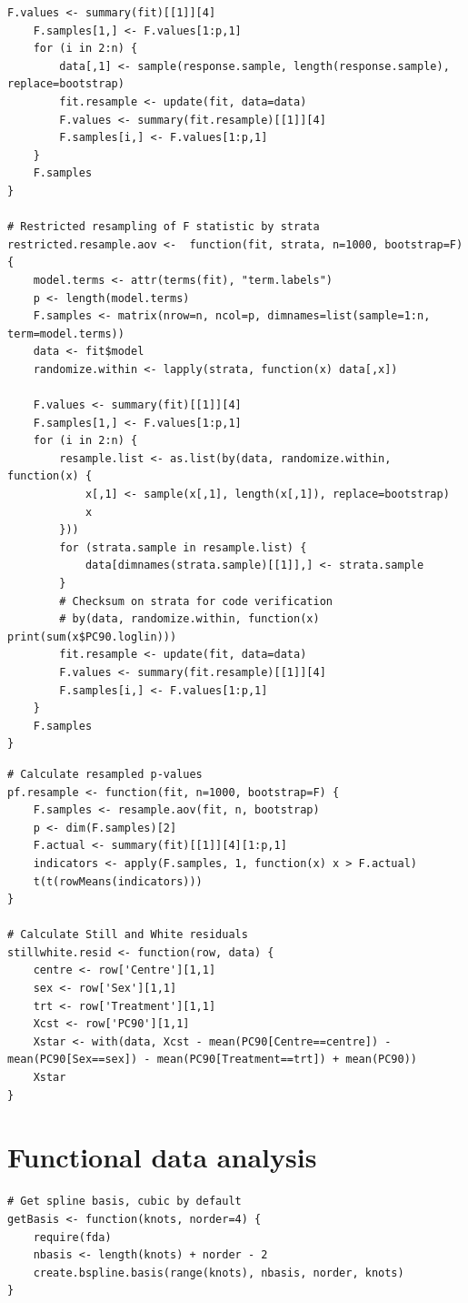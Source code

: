 \begin{singlespace}
\begin{lstlisting}[caption=Functions for resampling $F$ statistic,label=R:Fresamp]
	F.values <- summary(fit)[[1]][4]
	F.samples[1,] <- F.values[1:p,1]
	for (i in 2:n) {
		data[,1] <- sample(response.sample, length(response.sample), replace=bootstrap)
		fit.resample <- update(fit, data=data)
		F.values <- summary(fit.resample)[[1]][4]
		F.samples[i,] <- F.values[1:p,1]
	}
	F.samples	
}

# Restricted resampling of F statistic by strata
restricted.resample.aov <-  function(fit, strata, n=1000, bootstrap=F) {
	model.terms <- attr(terms(fit), "term.labels")
	p <- length(model.terms)
	F.samples <- matrix(nrow=n, ncol=p, dimnames=list(sample=1:n, term=model.terms))
	data <- fit$model
	randomize.within <- lapply(strata, function(x) data[,x])

	F.values <- summary(fit)[[1]][4]
	F.samples[1,] <- F.values[1:p,1]
	for (i in 2:n) {
		resample.list <- as.list(by(data, randomize.within, function(x) {
			x[,1] <- sample(x[,1], length(x[,1]), replace=bootstrap)
			x
		}))
		for (strata.sample in resample.list) {
			data[dimnames(strata.sample)[[1]],] <- strata.sample
		}
		# Checksum on strata for code verification
		# by(data, randomize.within, function(x) print(sum(x$PC90.loglin)))
		fit.resample <- update(fit, data=data)
		F.values <- summary(fit.resample)[[1]][4]
		F.samples[i,] <- F.values[1:p,1]
	}
	F.samples	
}
\end{lstlisting}

\begin{lstlisting}[caption=Functions to calculate resampled $p$-values and resampling residuals,label=R:resampmisc]
# Calculate resampled p-values
pf.resample <- function(fit, n=1000, bootstrap=F) {
	F.samples <- resample.aov(fit, n, bootstrap)
	p <- dim(F.samples)[2]
	F.actual <- summary(fit)[[1]][4][1:p,1]
	indicators <- apply(F.samples, 1, function(x) x > F.actual)
	t(t(rowMeans(indicators)))
}

# Calculate Still and White residuals
stillwhite.resid <- function(row, data) {
	centre <- row['Centre'][1,1]
	sex <- row['Sex'][1,1]
	trt <- row['Treatment'][1,1]
	Xcst <- row['PC90'][1,1]
	Xstar <- with(data, Xcst - mean(PC90[Centre==centre]) - mean(PC90[Sex==sex]) - mean(PC90[Treatment==trt]) + mean(PC90))
	Xstar
}
\end{lstlisting}

\clearpage
\section{Functional data analysis}\label{A:fda}
\begin{lstlisting}[caption=Functions for cubic spline smoothing,label=R:fdsmooth]
# Get spline basis, cubic by default
getBasis <- function(knots, norder=4) {
	require(fda)
	nbasis <- length(knots) + norder - 2
	create.bspline.basis(range(knots), nbasis, norder, knots)
}


\end{lstlisting}
\end{singlespace}
